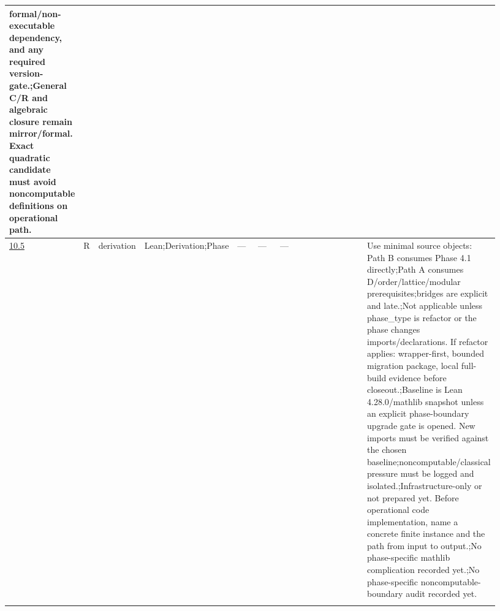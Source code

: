 \begin{longtable}{L{0.026\linewidth} L{0.024\linewidth} L{0.045\linewidth} L{0.07\linewidth} L{0.065\linewidth} L{0.075\linewidth} L{0.11\linewidth} L{0.19\linewidth} L{0.155\linewidth} L{0.17\linewidth}}
formal/\allowbreak{}non-executable dependency, and any required version-gate.;\newline General C/\allowbreak{}R and algebraic closure remain mirror/\allowbreak{}formal. Exact quadratic candidate must avoid noncomputable definitions on operational path.\\
\hline
\addlinespace[0.24em]
\hyperlink{phase-row-10-5}{10.5} & R & derivation & Lean;\newline Derivation;\newline Phase & --- & --- & --- &  &  & Use minimal source objects: Path B consumes Phase 4.1 directly;\newline Path A consumes D/\allowbreak{}order/\allowbreak{}lattice/\allowbreak{}modular prerequisites;\newline bridges are explicit and late.;\newline Not applicable unless phase\_type is refactor or the phase changes imports/\allowbreak{}declarations. If refactor applies: wrapper-first, bounded migration package, local full-build evidence before closeout.;\newline Baseline is Lean 4.28.0/\allowbreak{}mathlib snapshot unless an explicit phase-boundary upgrade gate is opened. New imports must be verified against the chosen baseline;\newline noncomputable/\allowbreak{}classical pressure must be logged and isolated.;\newline Infrastructure-only or not prepared yet. Before operational code implementation, name a concrete finite instance and the path from input to output.;\newline No phase-specific mathlib complication recorded yet.;\newline No phase-specific noncomputable-boundary audit recorded yet.\\
\hline
\addlinespace[0.24em]

\end{longtable}
